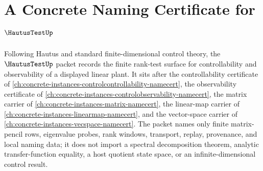 \chapter{A Concrete Naming Certificate for $\HautusTestUp$}
\label{ch:concrete-instances-hautus-test-namecert}

Following Hautus and standard finite-dimensional control theory, the $\HautusTestUp$ packet records the finite rank-test surface for controllability and observability of a displayed linear plant. It sits after the controllability certificate of \autoref{ch:concrete-instances-controlcontrollability-namecert}, the observability certificate of \autoref{ch:concrete-instances-controlobservability-namecert}, the matrix carrier of \autoref{ch:concrete-instances-matrix-namecert}, the linear-map carrier of \autoref{ch:concrete-instances-linearmap-namecert}, and the vector-space carrier of \autoref{ch:concrete-instances-vecspace-namecert}. The packet names only finite matrix-pencil rows, eigenvalue probes, rank windows, transport, replay, provenance, and local naming data; it does not import a spectral decomposition theorem, analytic transfer-function equality, a host quotient state space, or an infinite-dimensional control result.

